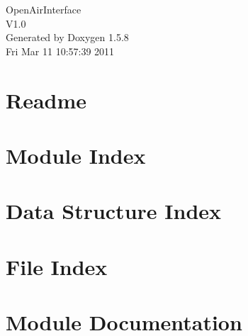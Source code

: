 \documentclass[a4paper]{book}
\begin{document}
\begin{titlepage}
\vspace*{7cm}
\begin{center}
{\Large OpenAirInterface \\[1ex]\large V1.0 }\\
\vspace*{1cm}
{\large Generated by Doxygen 1.5.8}\\
\vspace*{0.5cm}
{\small Fri Mar 11 10:57:39 2011}\\
\end{center}
\end{titlepage}
\clearemptydoublepage
{}
\tableofcontents
\clearemptydoublepage
{}
\chapter{Readme}
\label{_readme}

\chapter{Module Index}

\chapter{Data Structure Index}

\chapter{File Index}

\chapter{Module Documentation}




















\end{document}
